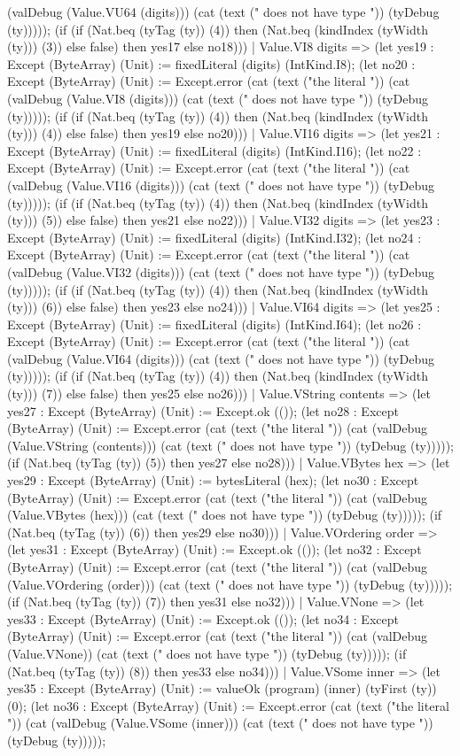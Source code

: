\documentclass[11pt]{article}
\begin{document}
(valDebug (Value.VU64 (digits))) (cat (text (" does not have type ")) (tyDebug (ty))))); (if (if (Nat.beq (tyTag (ty)) (4)) then (Nat.beq (kindIndex (tyWidth (ty))) (3)) else false) then yes17 else no18))) | Value.VI8 digits => (let yes19 : Except (ByteArray) (Unit) := fixedLiteral (digits) (IntKind.I8); (let no20 : Except (ByteArray) (Unit) := Except.error (cat (text ("the literal ")) (cat (valDebug (Value.VI8 (digits))) (cat (text (" does not have type ")) (tyDebug (ty))))); (if (if (Nat.beq (tyTag (ty)) (4)) then (Nat.beq (kindIndex (tyWidth (ty))) (4)) else false) then yes19 else no20))) | Value.VI16 digits => (let yes21 : Except (ByteArray) (Unit) := fixedLiteral (digits) (IntKind.I16); (let no22 : Except (ByteArray) (Unit) := Except.error (cat (text ("the literal ")) (cat (valDebug (Value.VI16 (digits))) (cat (text (" does not have type ")) (tyDebug (ty))))); (if (if (Nat.beq (tyTag (ty)) (4)) then (Nat.beq (kindIndex (tyWidth (ty))) (5)) else false) then yes21 else no22))) | Value.VI32 digits => (let yes23 : Except (ByteArray) (Unit) := fixedLiteral (digits) (IntKind.I32); (let no24 : Except (ByteArray) (Unit) := Except.error (cat (text ("the literal ")) (cat (valDebug (Value.VI32 (digits))) (cat (text (" does not have type ")) (tyDebug (ty))))); (if (if (Nat.beq (tyTag (ty)) (4)) then (Nat.beq (kindIndex (tyWidth (ty))) (6)) else false) then yes23 else no24))) | Value.VI64 digits => (let yes25 : Except (ByteArray) (Unit) := fixedLiteral (digits) (IntKind.I64); (let no26 : Except (ByteArray) (Unit) := Except.error (cat (text ("the literal ")) (cat (valDebug (Value.VI64 (digits))) (cat (text (" does not have type ")) (tyDebug (ty))))); (if (if (Nat.beq (tyTag (ty)) (4)) then (Nat.beq (kindIndex (tyWidth (ty))) (7)) else false) then yes25 else no26))) | Value.VString contents => (let yes27 : Except (ByteArray) (Unit) := Except.ok (()); (let no28 : Except (ByteArray) (Unit) := Except.error (cat (text ("the literal ")) (cat (valDebug (Value.VString (contents))) (cat (text (" does not have type ")) (tyDebug (ty))))); (if (Nat.beq (tyTag (ty)) (5)) then yes27 else no28))) | Value.VBytes hex => (let yes29 : Except (ByteArray) (Unit) := bytesLiteral (hex); (let no30 : Except (ByteArray) (Unit) := Except.error (cat (text ("the literal ")) (cat (valDebug (Value.VBytes (hex))) (cat (text (" does not have type ")) (tyDebug (ty))))); (if (Nat.beq (tyTag (ty)) (6)) then yes29 else no30))) | Value.VOrdering order => (let yes31 : Except (ByteArray) (Unit) := Except.ok (()); (let no32 : Except (ByteArray) (Unit) := Except.error (cat (text ("the literal ")) (cat (valDebug (Value.VOrdering (order))) (cat (text (" does not have type ")) (tyDebug (ty))))); (if (Nat.beq (tyTag (ty)) (7)) then yes31 else no32))) | Value.VNone => (let yes33 : Except (ByteArray) (Unit) := Except.ok (()); (let no34 : Except (ByteArray) (Unit) := Except.error (cat (text ("the literal ")) (cat (valDebug (Value.VNone)) (cat (text (" does not have type ")) (tyDebug (ty))))); (if (Nat.beq (tyTag (ty)) (8)) then yes33 else no34))) | Value.VSome inner => (let yes35 : Except (ByteArray) (Unit) := valueOk (program) (inner) (tyFirst (ty)) (0); (let no36 : Except (ByteArray) (Unit) := Except.error (cat (text ("the literal ")) (cat (valDebug (Value.VSome (inner))) (cat (text (" does not have type ")) (tyDebug (ty))))); 
\end{document}
